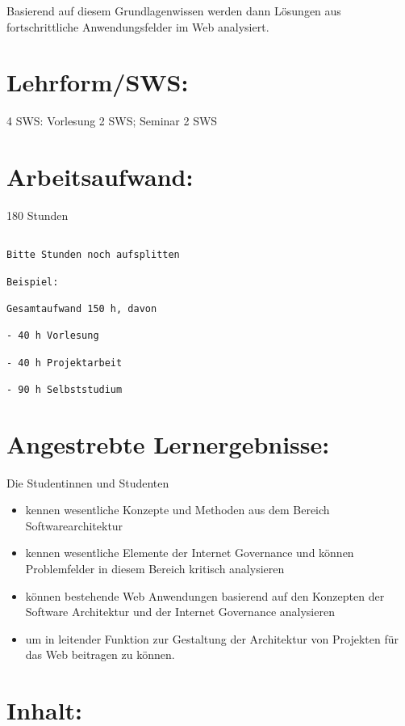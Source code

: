 Basierend auf diesem Grundlagenwissen werden dann Lösungen aus
fortschrittliche Anwendungsfelder im Web analysiert.

\section*{Lehrform/SWS:}\label{lehrformsws-22}

4 SWS: Vorlesung 2 SWS; Seminar 2 SWS

\section*{Arbeitsaufwand:}\label{arbeitsaufwand-28}

180 Stunden

\begin{verbatim}

Bitte Stunden noch aufsplitten

Beispiel:

Gesamtaufwand 150 h, davon 

- 40 h Vorlesung 

- 40 h Projektarbeit  

- 90 h Selbststudium 
\end{verbatim}

\section*{Angestrebte
Lernergebnisse:}\label{angestrebte-lernergebnisse-22}

Die Studentinnen und Studenten

\begin{itemize}
\item
  kennen wesentliche Konzepte und Methoden aus dem Bereich
  Softwarearchitektur
\item
  kennen wesentliche Elemente der Internet Governance und können
  Problemfelder in diesem Bereich kritisch analysieren
\item
  können bestehende Web Anwendungen basierend auf den Konzepten der
  Software Architektur und der Internet Governance analysieren
\item
  um in leitender Funktion zur Gestaltung der Architektur von Projekten
  für das Web beitragen zu können.
\end{itemize}

\section*{Inhalt:}\label{inhalt-22}

